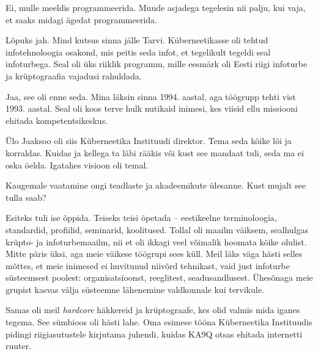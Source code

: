 Ei, mulle meeldis programmeerida. Muude asjadega tegelesin nii palju, 
kui vaja, et saaks midagi ägedat 
programmeerida. 



Lõpuks jah. Mind kutsus sinna jälle Tarvi. 
Küberneetikasse oli tehtud infotehnoloogia osakond, mis peitis seda infot, et 
tegelikult tegeldi seal infoturbega. Seal oli üks riiklik programm, 
mille eesmärk oli Eesti riigi infoturbe ja krüptograafia vajadusi rahuldada. 


Jaa, see oli enne seda. Mina läksin sinna 1994. aastal, aga töögrupp tehti vist 1993. aastal. Seal oli koos terve hulk nutikaid inimesi, kes 
viisid ellu missiooni ehitada kompetentsikeskus.

Ülo Jaaksoo oli siis Küberneetika 
Instituudi direktor. Tema seda kõike lõi ja korraldas. Kuidas ja kellega ta läbi rääkis või kust 
see mandaat tuli, seda ma ei oska öelda. Igatahes visioon oli temal. 


Kaugemale vaatamine ongi teadlaste ja akadeemikute ülesanne. Kust mujalt 
see tulla saab? 


Esiteks tuli ise õppida. Teiseks teisi õpetada – eestikeelne terminoloogia, 
standardid, profiilid, seminarid, koolitused. Tollal oli maailm 
väiksem, sealhulgas krüpto- ja infoturbemaailm, nii et oli
ikkagi veel võimalik hoomata kõike olulist. Mitte päris üksi,
aga meie väikese töögrupi sees küll. Meil läks väga 
hästi selles mõttes, et meie inimesed ei huvitunud niivõrd tehnikast, vaid just  
infoturbe süsteemsest poolest: organisatsioonst, reeglitest, 
seadusandlusest. Ühesõnaga meie grupist kasvas välja süsteemne lähenemine valdkonnale kui 
tervikule. 

Samas oli meil \emph{hardcore} häkkereid ja krüptograafe, kes olid valmis mida iganes tegema. See 
sümbioos oli hästi lahe. Oma esimese tööna 
Küberneetika Instituudis pidingi riigiasutustele kirjutama 
juhendi, kuidas KA9Q otsas ehitada internetti ruuter. 

